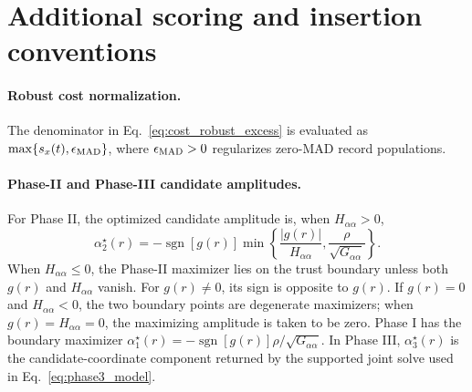 \documentclass[
  reprint,
  amsmath,
  amssymb,
  aps,
  pra,
  nofootinbib,
  superscriptaddress,
  floatfix
]{revtex4-2}
\begin{document}
\section{Additional scoring and insertion conventions}
\label{app:numerical_conventions}

\paragraph*{Robust cost normalization.}
The denominator in Eq.~\eqref{eq:cost_robust_excess} is evaluated as
\(\max\{s_x(t),\epsilon_{\rm MAD}\}\), where
\(\epsilon_{\rm MAD}>0\) regularizes zero-MAD record populations.

\paragraph*{Phase-II and Phase-III candidate amplitudes.}
For Phase II, the optimized candidate amplitude is, when
\(H_{\alpha\alpha}>0\),
\begin{equation}
\alpha_2^\star(r)
=-\operatorname{sgn}[g(r)]
\min\!\left\{
\frac{|g(r)|}{H_{\alpha\alpha}},
\frac{\rho}{\sqrt{G_{\alpha\alpha}}}
\right\}.
\label{eq:phase2_alpha_star}
\end{equation}
When \(H_{\alpha\alpha}\le0\), the Phase-II maximizer lies on the trust
boundary unless both \(g(r)\) and \(H_{\alpha\alpha}\) vanish. For
\(g(r)\ne0\), its sign is opposite to \(g(r)\). If \(g(r)=0\) and
\(H_{\alpha\alpha}<0\), the two boundary points are degenerate maximizers;
when \(g(r)=H_{\alpha\alpha}=0\), the maximizing amplitude is taken to be
zero. Phase I has the boundary maximizer
\(\alpha_1^\star(r)=-\operatorname{sgn}[g(r)]
\rho/\sqrt{G_{\alpha\alpha}}\). In Phase III,
\(\alpha_3^\star(r)\) is the candidate-coordinate component returned by the
supported joint solve used in Eq.~\eqref{eq:phase3_model}.
\end{document}

